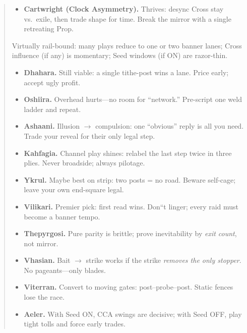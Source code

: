 \documentclass[11pt]{article}
\begin{document}
\begin{quote}
\begin{tcolorbox}[enhanced,breakable,title={4$\times$4 Pocket Diamond --- What Changes},
  colback=white,colframe=royal,boxrule=0.8pt]
\begin{itemize}[leftmargin=1.1em,itemsep=0.3em]
\item \textbf{Cartwright (Clock Asymmetry).} Thrives: desync Cross stay vs.\ exile, then trade shape for time. Break the mirror with a single retreating Prop.
\end{itemize}
\end{tcolorbox}

\begin{tcolorbox}[enhanced,breakable,title={2$\times$4 Micro-Strip --- What Survives},
  colback=white,colframe=royal,boxrule=0.8pt]
\small
\noindent Virtually rail-bound: many plays reduce to one or two banner lanes; Cross influence (if any) is momentary; Seed windows (if ON) are razor-thin.
\begin{itemize}[leftmargin=1.1em,itemsep=0.3em]

\item \textbf{Dhahara.} Still viable: a single tithe-post wins a lane. Price early; accept ugly profit.

\item \textbf{Oshiira.} Overhead hurts---no room for ``network.'' Pre-script one weld ladder and repeat.

\item \textbf{Ashaani.} Illusion $\rightarrow$ compulsion: one ``obvious'' reply is all you need. Trade your reveal for their only legal step.

\item \textbf{Kahfagia.} Channel play shines: relabel the last step twice in three plies. Never broadside; always pilotage.

\item \textbf{Ykrul.} Maybe best on strip: two posts = no road. Beware self-cage; leave your own end-square legal.

\item \textbf{Vilikari.} Premier pick: first read wins. Don``t linger; every raid must become a banner tempo.

\item \textbf{Thepyrgosi.} Pure parity is brittle; prove inevitability by \emph{exit count}, not mirror.

\item \textbf{Vhasian.} Bait $\rightarrow$ strike works if the strike \emph{removes the only stopper}. No pageants---only blades.

\item \textbf{Viterran.} Convert to moving gates: post--probe--post. Static fences lose the race.

\item \textbf{Aeler.} With Seed ON, CCA swings are decisive; with Seed OFF, play tight tolls and force early trades.


\end{itemize}
\end{tcolorbox}
\end{quote}
\end{document}
